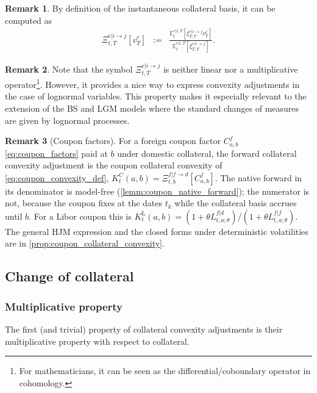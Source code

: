 \documentclass[11pt,english]{amsart}
\newcommand{\EE}{\mathbb{E}}
\newcommand{\Q}{\Xi}
\theoremstyle{definition}
\newtheorem{rema}{Remark}
\begin{document}
\begin{rema}
By definition of the instantaneous collateral basis, it can be computed as
\begin{eqnarray}
  \Q^{e|i\to j}_{t,T}[v^e_T] &:=& \frac{\EE^{e|i,T}_t\left[  \xi^{e|i\to j}_{T,T} v^e_T  \right]}{\EE^{e|i,T}_t\left[  \xi^{e|i\to j}_{T,T}   \right]}  .
\end{eqnarray}
\end{rema}

\begin{rema}
Note that the symbol $\Q^{e|i\to j}_{t,T}$ is neither linear nor a multiplicative operator\footnote{For mathematicians, it can be seen as the differential/coboundary operator in cohomology.
}. However, it provides a nice way to express convexity adjustments in the case of lognormal variables. This property makes it especially relevant to the extension of the BS and LGM models where the standard changes of measures are given by lognormal processes.
\end{rema}

\begin{rema}[Coupon factors]\label{rema:coupon_convexity_hjm}
For a foreign coupon factor $C^f_{a,b}$ \eqref{eq:coupon_factors} paid at $b$ under domestic collateral, the forward collateral convexity adjustment is the coupon collateral convexity of \eqref{eq:coupon_convexity_def}, $K^C_t(a,b) = \Q^{f|f\to d}_{t,b}[C^f_{a,b}]$. The native forward in its denominator is model-free (\autoref{lemm:coupon_native_forward}); the numerator is not, because the coupon fixes at the dates $t_k$ while the collateral basis accrues until $b$. For a Libor coupon this is $K^{\mathrm{L}}_t(a,b) = (1+\theta L^{f|d}_{t,a;\theta})/(1+\theta L^{f|f}_{t,a;\theta})$. The general HJM expression and the closed forms under deterministic volatilities are in \autoref{prop:coupon_collateral_convexity}.
\end{rema}

\subsection{Change of collateral}


\subsubsection{Multiplicative property}
The first (and trivial) property of collateral convexity adjustments is their multiplicative property with respect to collateral.
\end{document}
